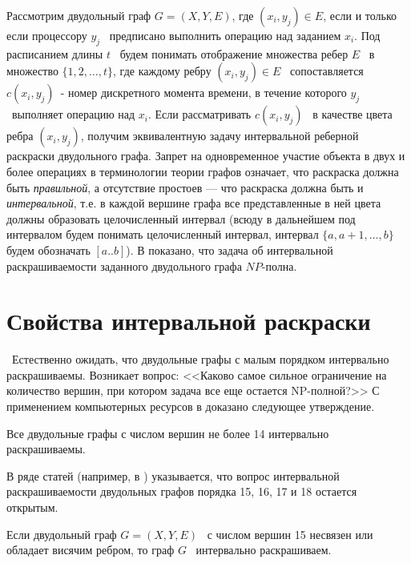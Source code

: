 Рассмотрим двудольный граф  $G=\left(X,Y,E\right)$, где  $\left(x_i,y_j\right)\in E$, если и только если процессору
$y_j$ \ предписано выполнить операцию над заданием  $x_i$. Под расписанием длины  $t$ \ будем понимать отображение
множества ребер  $E$ \ в множество  $\{1,2,\dots ,t\}$, где каждому ребру  $\left(x_i,y_j\right)\in E$
\ сопоставляется  $c\left(x_i,y_j\right)$\ - номер дискретного момента времени, в течение которого  $y_j$ \ выполняет
операцию над  $x_i$. Если рассматривать  $c(x_i,y_j)$ \ в качестве цвета ребра $(x_i,y_j)$, получим эквивалентную
задачу интервальной реберной раскраски двудольного графа. Запрет на одновременное участие объекта в двух и более
операциях в терминологии теории графов означает, что раскраска должна быть \textit{правильной}, а отсутствие простоев ---
что раскраска должна быть и \textit{интервальной}, т.е. в каждой вершине графа все представленные в ней цвета должны
образовать целочисленный интервал (всюду в дальнейшем под интервалом будем понимать целочисленный интервал, интервал
$\{a,a+1,\dots ,b\}$ будем обозначать $[a..b]$). В \cite{AKM_ch1_bib5} показано, что задача об интервальной раскрашиваемости
заданного двудольного графа  $\mathit{NP}${}-полна.

\section{Свойства интервальной раскраски}\label{AKM_ch1_2}

\ Естественно ожидать, что двудольные графы с малым порядком интервально раскрашиваемы. Возникает вопрос: <<Каково самое
сильное ограничение на количество вершин, при котором задача все еще остается NP-полной?>> С применением компьютерных
ресурсов в \cite{AKM_ch1_bib6} доказано следующее утверждение.

\begin{statement}\label{AKM_ch1_s1}
	Все двудольные графы с числом вершин не более 14 интервально раскрашиваемы.
\end{statement}

В ряде статей (например, в \cite{AKM_ch1_bib7}) указывается, что вопрос интервальной раскрашиваемости двудольных графов порядка 15, 16,
17 и 18 остается открытым.

\begin{corollary}
	Если двудольный граф  $G=(X,Y,E)$ \ с числом вершин 15 несвязен или обладает висячим ребром, то граф  $G$
	\ интервально раскрашиваем.
\end{corollary}

